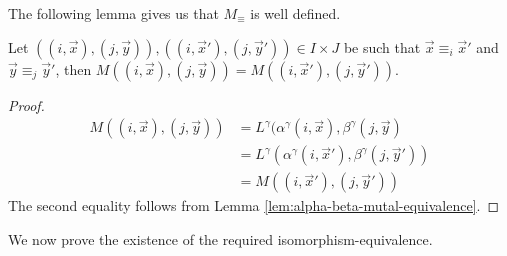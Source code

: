 \documentclass[../paper.tex]{subfiles}
\begin{document}
The following lemma gives us that $M_\equiv$ is well defined.

\begin{lem}
	Let $((i, \vec{x}), (j, \vec{y})), ((i, \vec{x}'), (j, \vec{y}')) \in I \times
  J$ be such that $\vec{x} \equiv_i \vec{x}'$ and $\vec{y} \equiv_j \vec{y}'$,
  then $M((i, \vec{x}), (j, \vec{y})) = M((i, \vec{x}'), (j, \vec{y}'))$.
	\label{lem:matrix-quot-well-defined}
\end{lem}
\begin{proof}
	\begin{align*}
		M((i, \vec{x}),(j, \vec{y})) & = L^{\gamma}(\alpha^{\gamma}(i, \vec{x}), \beta^{\gamma}(j, \vec{y})    \\
		                             & = L^{\gamma}(\alpha^{\gamma}(i, \vec{x}'), \beta^{\gamma}(j, \vec{y}')) \\
		                             & = M((i, \vec{x}'), (j, \vec{y}'))                                       
	\end{align*}
	The second equality follows from Lemma \ref{lem:alpha-beta-mutal-equivalence}.
\end{proof}

We now prove the existence of the required isomorphism-equivalence.
\end{document}

